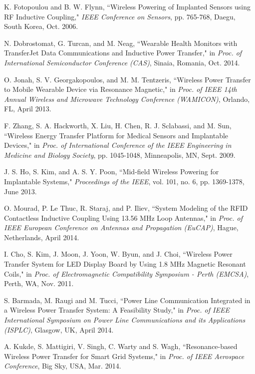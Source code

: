 \documentclass[twocolumn,10pt]{IEEEtran}
\begin{document}
\begin{thebibliography}{99}
K. Fotopoulou and B. W. Flynn, ``Wireless Powering of Implanted
Sensors using RF Inductive Coupling," \emph{IEEE Conference on Sensors}, pp. 765-768, Daegu, South Korea, Oct. 2006.

N. Dobrostomat,  G. Turcan, and M. Neag, ``Wearable Health Monitors with TransferJet Data Communications and Inductive Power Transfer,"
in \emph{Proc. of International Semiconductor Conference (CAS)}, Sinaia, Romania, Oct. 2014. 

 O. Jonah, S. V. Georgakopoulos, and M. M. Tentzeris, ``Wireless Power Transfer to Mobile Wearable Device via Resonance Magnetic," in \emph{Proc. of IEEE 14th Annual Wireless and Microwave Technology Conference (WAMICON)}, Orlando, FL, April 2013.


F. Zhang, S. A. Hackworth, X. Liu, H. Chen, R. J. Sclabassi, and
M. Sun, ``Wireless Energy Transfer Platform for Medical Sensors and Implantable Devices," in \emph{Proc. of International Conference of the IEEE Engineering in Medicine and Biology Society}, pp. 1045-1048, Minneapolis, MN, Sept. 2009.

J. S. Ho, S. Kim, and A. S. Y. Poon, ``Mid-field Wireless Powering for Implantable Systems," \emph{Proceedings of the IEEE}, vol. 101, no. 6, pp. 1369-1378, June 2013.

 O. Mourad, P. Le Thuc, R. Staraj, and P. Iliev, ``System Modeling of the RFID Contactless Inductive Coupling Using 13.56 MHz Loop Antennas," in \emph{Proc. of IEEE European Conference on  Antennas and Propagation (EuCAP)}, Hague, Netherlands, April 2014. 

 I. Cho, S. Kim, J. Moon, J. Yoon, W. Byun, and J. Choi, ``Wireless Power Transfer System for LED Display Board by Using 1.8 MHz Magnetic Resonant Coils," in \emph{Proc. of
Electromagnetic Compatibility Symposium - Perth (EMCSA)}, Perth, WA, Nov. 2011.

S. Barmada, M. Raugi and M. Tucci, ``Power Line Communication Integrated in a Wireless Power Transfer System: A Feasibility Study," in \emph{Proc. of IEEE International Symposium on
Power Line Communications and its Applications (ISPLC)}, Glasgow, UK, April 2014. 
 
A. Kukde, S. Mattigiri, V. Singh, C. Warty and S. Wagh, ``Resonance-based Wireless Power Transfer for Smart Grid Systems," in \emph{Proc. of IEEE Aerospace Conference}, Big Sky, USA, Mar. 2014.   
 

\end{thebibliography}
\end{document}
